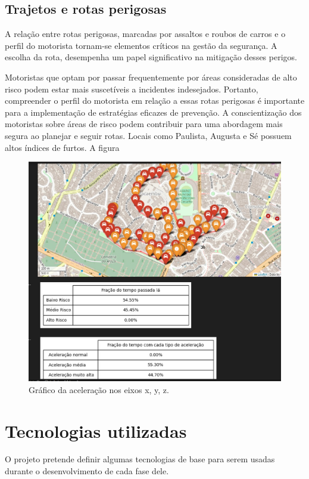 \subsection{Trajetos e rotas perigosas}

A relação entre rotas perigosas, marcadas por assaltos e roubos de carros e o perfil do motorista tornam-se elementos críticos na gestão da segurança. A escolha da rota, desempenha um papel significativo na mitigação desses perigos. 

Motoristas que optam por passar frequentemente por áreas consideradas de alto risco podem estar mais suscetíveis a incidentes indesejados. Portanto, compreender o perfil do motorista em relação a essas rotas perigosas é importante para a implementação de estratégias eficazes de prevenção. A conscientização dos motoristas sobre áreas de risco podem contribuir para uma abordagem mais segura ao planejar e seguir rotas.
Locais como Paulista, Augusta e Sé possuem altos índices de furtos. A figura 

\begin{figure}[hp]
    \centering
    
    \includegraphics[scale=0.8]{figures/rotas_autorisco.jpeg}
    
    \caption{Gráfico da aceleração nos eixos x, y, z.}
    
    \label{fig:aceleracao}
\end{figure}

 
\section{Tecnologias utilizadas}
O projeto pretende definir algumas tecnologias de base para serem usadas durante o desenvolvimento de cada fase dele.

